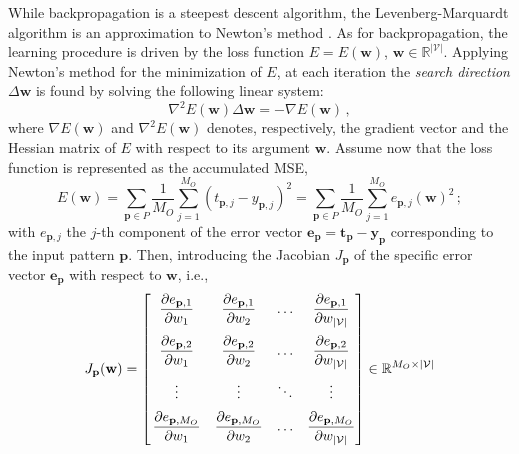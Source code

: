 \documentclass[12pt, a4paper, twoside, openright, notitlepage]{report}
\numberwithin{equation}{chapter}
\theoremstyle{theorem}
\theoremstyle{definition}
\theoremstyle{remark}
\theoremstyle{proposition}
\numberwithin{figure}{chapter}
\begin{document}
		While backpropagation is a steepest descent algorithm, the Levenberg-Marquardt algorithm \cite{Mar63} is an approximation to Newton's method \cite{Hag94}. As for backpropagation, the learning procedure is driven by the loss function $E = E(\mathbf{w})$, $\mathbf{w} \in \mathbb{R}^{|\mathcal{V}|}$. Applying Newton's method for the minimization of $E$, at each iteration the \emph{search direction} $\Delta \mathbf{w}$ is found by solving the following linear system:
		\begin{equation}
			\label{eq:newton}
			\nabla^2 E(\mathbf{w}) \Delta \mathbf{w} = - \nabla E(\mathbf{w}) \, ,
		\end{equation}
		where $\nabla E(\mathbf{w})$ and $\nabla^2 E(\mathbf{w})$ denotes, respectively, the gradient vector and the Hessian matrix of $E$ with respect to its argument $\mathbf{w}$. Assume now that the loss function is represented as the accumulated MSE, 
		\begin{equation*}
			\label{eq:accumulated-mse-bis}
			E(\mathbf{w}) = \sum_{\mathbf{p} \in P} \dfrac{1}{M_O} \sum_{j = 1}^{M_O} \left( t_{\mathbf{p},j} - y_{\mathbf{p},j} \right)^2 = \sum_{\mathbf{p} \in P} \dfrac{1}{M_O} \sum_{j = 1}^{M_O} e_{\mathbf{p},j}(\mathbf{w})^2 \, ;
		\end{equation*}
		with $e_{\mathbf{p},j}$ the $j$-th component of the error vector $\mathbf{e}_{\mathbf{p}} = \mathbf{t}_{\mathbf{p}} - \mathbf{y}_{\mathbf{p}}$ corresponding to the input pattern $\mathbf{p}$. Then, introducing the Jacobian $J_{\mathbf{p}}$ of the specific error vector $\mathbf{e}_{\mathbf{p}}$ with respect to $\mathbf{w}$, i.e., 
		\begin{equation}
			\label{eq:jacobian}
			J_{\mathbf{p}}(\mathbf{w}) = 
			\begin{bmatrix}
				\vspace*{0.2cm}
				\hspace*{-0.3cm} & \dfrac{\partial e_{\mathbf{p},1}}{\partial w_1} & \dfrac{\partial e_{\mathbf{p},1}}{\partial w_2} & \ldots & \dfrac{\partial e_{\mathbf{p},1}}{\partial w_{|\mathcal{V}|}} \\
				\vspace*{0.2cm}
				\hspace*{-0.3cm} & \dfrac{\partial e_{\mathbf{p},2}}{\partial w_1} & \dfrac{\partial e_{\mathbf{p},2}}{\partial w_2} & \ldots & \dfrac{\partial e_{\mathbf{p},2}}{\partial w_{|\mathcal{V}|}} \\
				\vspace*{0.2cm}
				\hspace*{-0.3cm} & \vdots & \vdots & \ddots & \vdots \\
				\hspace*{-0.3cm} & \dfrac{\partial e_{\mathbf{p},M_O}}{\partial w_1} & \dfrac{\partial e_{\mathbf{p},M_O}}{\partial w_2} & \ldots & \dfrac{\partial e_{\mathbf{p},M_O}}{\partial w_{|\mathcal{V}|}}
			\end{bmatrix}
			\in \mathbb{R}^{M_O \times |\mathcal{V}|}
		\end{equation}
\end{document}
